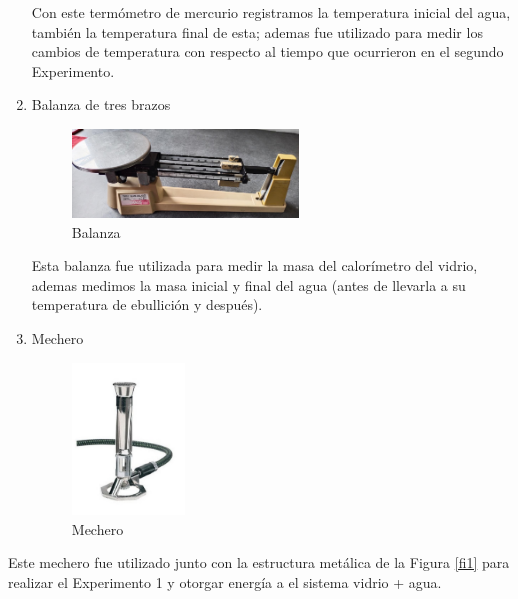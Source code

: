 \documentclass[journal,transmag]{IEEEtran}
\begin{document}
\begin{enumerate}
	Con este termómetro de mercurio registramos la temperatura inicial del agua, también la temperatura final de esta; ademas fue utilizado para medir los cambios de temperatura con respecto al tiempo que ocurrieron en el segundo Experimento.

 \item Balanza de tres brazos
			\begin{figure}[!h]
				\center
				\includegraphics[width=6cm]{img/pesa.jpeg}
				\caption{Balanza}
				\label{f4}
			\end{figure}
			
	Esta balanza fue utilizada para medir la masa del calorímetro del vidrio, ademas medimos la masa inicial y final del agua (antes de llevarla a su temperatura de ebullición y después).

\item Mechero
			\begin{figure}[!h]
				\center
				\includegraphics[width=3cm]{img/mechero.jpg}
				\caption{Mechero}
				\label{f4}
			\end{figure}
	\end{enumerate}

Este mechero fue utilizado junto con la estructura metálica de la Figura \ref{fi1} para realizar el Experimento 1 y otorgar energía a el sistema vidrio + agua.

\vspace{5mm}
\end{document}
